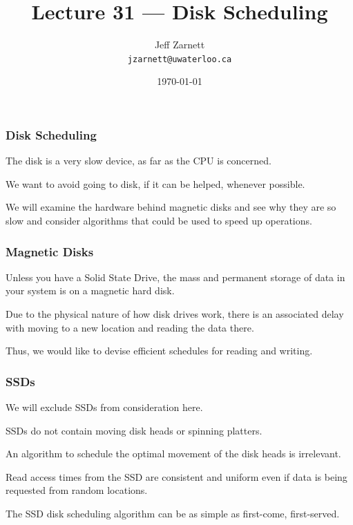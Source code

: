 

\title{Lecture 31 --- Disk Scheduling }

\author{Jeff Zarnett \\ \small \texttt{jzarnett@uwaterloo.ca}}
\date{\today}




\begin{frame}
  \titlepage

 \end{frame}



\begin{frame}
\frametitle{Disk Scheduling}

The disk is a very slow device, as far as the CPU is concerned.

We want to avoid going to disk, if it can be helped, whenever possible. 

We will examine the hardware behind magnetic disks and see why they are so slow and consider algorithms that could be used to speed up operations.


\end{frame}

\begin{frame}
\frametitle{Magnetic Disks}

Unless you have a Solid State Drive, the mass and permanent storage of data in your system is on a magnetic hard disk. 

Due to the physical nature of how disk drives work, there is an associated delay with moving to a new location and reading the data there. 

Thus, we would like to devise efficient schedules for reading and writing.


\end{frame}

\begin{frame}
\frametitle{SSDs}

We will exclude SSDs from consideration here. 

SSDs do not contain moving disk heads or spinning platters. 

An algorithm to schedule the optimal movement of the disk heads is irrelevant. 

Read access times from the SSD are consistent and uniform even if data is being requested from random locations. 

The SSD disk scheduling algorithm can be as simple as first-come, first-served.


\end{frame}

